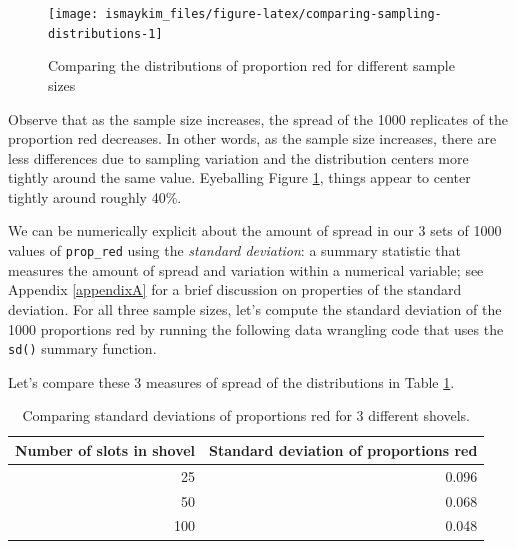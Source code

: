 \documentclass[12pt, krantz2,]{krantz}
\makeatletter
\newenvironment{Shaded}{\begin{snugshade}}{\end{snugshade}}
\newcommand{\CommentTok}[1]{\textcolor[rgb]{0.37,0.37,0.37}{\textit{#1}}}
\newcommand{\DataTypeTok}[1]{\textcolor[rgb]{0.27,0.27,0.27}{#1}}
\newcommand{\DecValTok}[1]{\textcolor[rgb]{0.06,0.06,0.06}{#1}}
\newcommand{\KeywordTok}[1]{\textcolor[rgb]{0.27,0.27,0.27}{\textbf{#1}}}
\newcommand{\NormalTok}[1]{#1}
\newcommand{\OperatorTok}[1]{\textcolor[rgb]{0.43,0.43,0.43}{\textbf{#1}}}
\newcommand{\StringTok}[1]{\textcolor[rgb]{0.5,0.5,0.5}{#1}}
\newenvironment{kframe}{%
\medskip{}
\setlength{\fboxsep}{.8em}
 \def\at@end@of@kframe{}%
 \ifinner\ifhmode%
  \def\at@end@of@kframe{\end{minipage}}%
  \begin{minipage}{\columnwidth}%
 \fi\fi%
 \def\FrameCommand##1{\hskip\@totalleftmargin \hskip-\fboxsep
 \colorbox{shadecolor}{##1}\hskip-\fboxsep
     \hskip-\linewidth \hskip-\@totalleftmargin \hskip\columnwidth}%
 \MakeFramed {\advance\hsize-\width
   \@totalleftmargin\z@ \linewidth\hsize
   \@setminipage}}%
 {\par\unskip\endMakeFramed%
 \at@end@of@kframe}
\renewenvironment{Shaded}{\begin{kframe}}{\end{kframe}}
\makeatother
\begin{document}
\begin{figure}

{\centering \texttt{[image: ismaykim\_files/figure-latex/comparing-sampling-distributions-1]} 

}

\caption{Comparing the distributions of proportion red for different sample sizes}\label{fig:comparing-sampling-distributions}
\end{figure}

Observe that as the sample size increases, the spread of the 1000 replicates of the proportion red decreases. In other words, as the sample size increases, there are less differences due to sampling variation and the distribution centers more tightly around the same value. Eyeballing Figure \ref{fig:comparing-sampling-distributions}, things appear to center tightly around roughly 40\%.

We can be numerically explicit about the amount of spread in our 3 sets of 1000 values of \texttt{prop\_red} using the \emph{standard deviation}: a summary statistic that measures the amount of spread and variation within a numerical variable; see Appendix \ref{appendixA} for a brief discussion on properties of the standard deviation. For all three sample sizes, let's compute the standard deviation of the 1000 proportions red by running the following data wrangling code that uses the \texttt{sd()} summary function.

\begin{Shaded}
\end{Shaded}

Let's compare these 3 measures of spread of the distributions in Table \ref{tab:comparing-n}.

\begin{table}[H]

\caption{\label{tab:comparing-n}Comparing standard deviations of proportions red for 3 different shovels.}
\centering
\fontsize{10}{12}\selectfont
\begin{tabular}{rr}
\toprule
Number of slots in shovel & Standard deviation of proportions red\\
\midrule
25 & 0.096\\
50 & 0.068\\
100 & 0.048\\
\bottomrule
\end{tabular}
\end{table}
\end{document}
